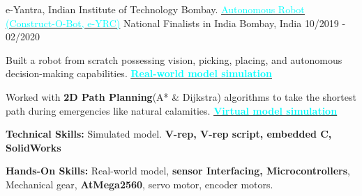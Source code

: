 

\begin{cventries}


  \cventry
    {e-Yantra, Indian Institute of Technology Bombay.} %
    {
    {\href{https://youtu.be/NCbEUZE8Mh8?t=5811}{\underline{\textcolor{cyan}{Autonomous Robot (Construct-O-Bot, e-YRC)}}}}  National Finalists in India} %
    {Bombay, India} %
    {10/2019 - 02/2020} %
    {
      \begin{cvitems} %
        \item {Built a robot from scratch possessing vision, picking, placing, and autonomous decision-making capabilities. \href{https://drive.google.com/file/d/1oJ6al_lPnGOr9SYTU5YMfTVvkMLo17Xd/view}{\underline{\textcolor{cyan}{\bf Real-world model simulation}}}}
        \item {Worked with {\bf 2D Path Planning}(A* \& Dijkstra) algorithms to take the shortest path during emergencies like natural calamities.
        \href{https://www.youtube.com/watch?v=UqZlvbHdpMs}{\underline{\textcolor{cyan}{\bf Virtual model simulation}}}}
        \item {\textbf{Technical Skills:} Simulated model. {\bf V-rep, V-rep script, embedded C,  SolidWorks}}
        \item {\textbf{Hands-On Skills:} Real-world model, {\bf sensor Interfacing, Microcontrollers}, Mechanical gear, {\bf AtMega2560}, servo motor, encoder motors.}
      \end{cvitems}
    }

\end{cventries}
